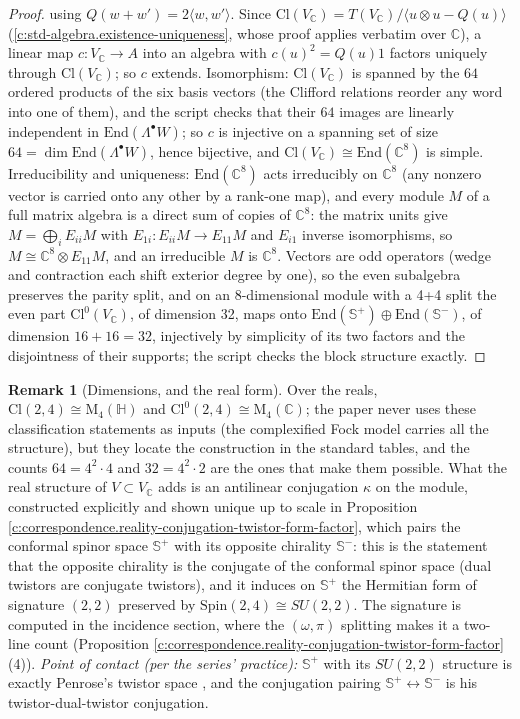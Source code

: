 \documentclass[11pt]{article}
\theoremstyle{definition}
\newtheorem{remark}[theorem]{Remark}
\theoremstyle{plain}
\newcommand{\changedmark}[2]{\marginpar{\raggedright\scriptsize\color{#1}#2}}
\providecommand{\C}{}\renewcommand{\C}{\mathbb{C}}
\providecommand{\CS}{}\renewcommand{\CS}{{\mathbb{S}^{+}}}
\providecommand{\CSm}{}\renewcommand{\CSm}{{\mathbb{S}^{-}}}
\providecommand{\Cl}{}\renewcommand{\Cl}{\mathrm{Cl}}
\providecommand{\End}{}\renewcommand{\End}{\mathrm{End}}
\providecommand{\HH}{}\renewcommand{\HH}{\mathbb{H}}
\providecommand{\Mat}{}\renewcommand{\Mat}{\mathrm{M}}
\providecommand{\ip}{}\renewcommand{\ip}[2]{\langle #1, #2\rangle}
\begin{document}
\begin{proof}
using $Q(w+w') = 2\ip{w}{w'}$. Since $\Cl(V_\C) = T(V_\C)/\langle u\otimes u - Q(u)\rangle$ (\ref{c:std-algebra.existence-uniqueness}, whose proof applies verbatim over $\C$), a linear map $c: V_\C \to A$ into an algebra with $c(u)^2 = Q(u)1$ factors uniquely through $\Cl(V_\C)$; so $c$ extends. Isomorphism: $\Cl(V_\C)$ is spanned by the $64$ ordered products of the six basis vectors (the Clifford relations reorder any word into one of them), and the script checks that their $64$ images are linearly independent in $\End(\Lambda^\bullet W)$; so $c$ is injective on a spanning set of size $64 = \dim \End(\Lambda^\bullet W)$, hence bijective, and $\Cl(V_\C) \cong \End(\C^8)$ is simple. Irreducibility and uniqueness: $\End(\C^8)$ acts irreducibly on $\C^8$ (any nonzero vector is carried onto any other by a rank-one map), and every module $M$ of a full matrix algebra is a direct sum of copies of $\C^8$: the matrix units give $M = \bigoplus_i E_{ii}M$ with $E_{1i}: E_{ii}M \to E_{11}M$ and $E_{i1}$ inverse isomorphisms, so $M \cong \C^8 \otimes E_{11}M$, and an irreducible $M$ is $\C^8$. Vectors are odd operators (wedge and contraction each shift exterior degree by one), so the even subalgebra preserves the parity split, and on an 8-dimensional module with a 4+4 split the even part $\Cl^0(V_\C)$, of dimension 32, maps onto $\End(\CS)\oplus\End(\CSm)$, of dimension $16 + 16 = 32$, injectively by simplicity of its two factors and the disjointness of their supports; the script checks the block structure exactly.

\end{proof}

\begin{remark}[Dimensions, and the real form]\label{c:note.correspondence.dimensions-real-form}
\changedmark{gray}{reworded}
Over the reals, $\Cl(2,4) \cong \Mat_4(\HH)$ and $\Cl^0(2,4) \cong \Mat_4(\C)$; the paper never uses these classification statements as inputs (the complexified Fock model carries all the structure), but they locate the construction in the standard tables, and the counts $64 = 4^2\cdot 4$ and $32 = 4^2 \cdot 2$ are the ones that make them possible. What the real structure of $V \subset V_\C$ adds is an antilinear conjugation $\kappa$ on the module, constructed explicitly and shown unique up to scale in Proposition \ref{c:correspondence.reality-conjugation-twistor-form-factor}, which pairs the conformal spinor space $\CS$ with its opposite chirality $\CSm$: this is the statement that the opposite chirality is the conjugate of the conformal spinor space (dual twistors are conjugate twistors), and it induces on $\CS$ the Hermitian form of signature $(2,2)$ preserved by $\mathrm{Spin}(2,4) \cong SU(2,2)$. The signature is computed in the incidence section, where the $(\omega, \pi)$ splitting makes it a two-line count (Proposition \ref{c:correspondence.reality-conjugation-twistor-form-factor}(4)). \emph{Point of contact (per the series' practice):} $\CS$ with its $SU(2,2)$ structure is exactly Penrose's twistor space \cite{Penrose1967, PenroseRindler86}, and the conjugation pairing $\CS \leftrightarrow \CSm$ is his twistor-dual-twistor conjugation.
\end{remark}
\end{document}
